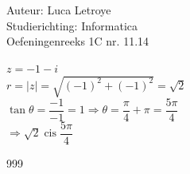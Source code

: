 \documentclass[a4paper]{article}
\begin{document}
  
\noindent \large Auteur: Luca Letroye \\
\noindent \large Studierichting: Informatica\\
\noindent \large Oefeningenreeks 1C nr. 11.14\\

\medskip

\normalsize

$z = -1 - i$\\

$r = \mid z \mid = \sqrt{(-1)^2+(-1)^2} = \sqrt{2}$\\

$\tan \theta = \dfrac{-1}{-1} = 1 \Rightarrow \theta = \dfrac{\pi}{4} + \pi = \dfrac{5\pi}{4}$\\

$\Rightarrow \sqrt{2}\operatorname{cis}{\dfrac{5\pi}{4}}$




\begin{thebibliography}{999}
\end{thebibliography}
\end{document}
